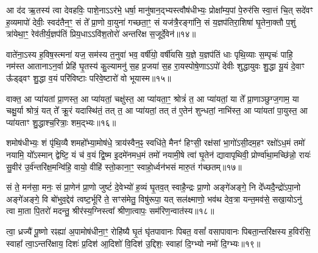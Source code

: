 {\anuvakamend[{भव॑त॒मेक॑त्रिꣳशच्च॥७॥}]}

आ द॑द ऋ॒तस्य॑ त्वा देवहविः॒ पाशे॒ना\-ऽ\-ऽर॑भे॒ धर्\mbox{}षा॒ मानु॑षान॒द्भ्यस्त्वौष॑धीभ्यः॒ प्रोक्षा᳚म्य॒पां पे॒रुर॑सि स्वा॒त्तं चि॒त् सदे॑वꣳ ह॒व्यमापो॑ देवीः॒ स्वद॑तैन॒ꣳ॒ सं ते᳚ प्रा॒णो वा॒युना॑ गच्छता॒ꣳ॒ सं यज॑त्रै॒रङ्गा॑नि॒ सं य॒ज्ञप॑तिरा॒शिषा॑ घृ॒तेना॒क्तौ प॒शुं त्रा॑येथा॒ꣳ॒ रेव॑तीर्य॒ज्ञप॑तिं प्रिय॒धा\-ऽ\-ऽवि॑श॒तोरो॑ अन्तरिक्ष स॒जूर्दे॒वेन॑॥१४॥

वाते॑ना॒\-ऽस्य ह॒विष॒स्त्मना॑ यज॒ सम॑स्य त॒नुवा॑ भव॒ वर्\mbox{}षी॑यो॒ वर्\mbox{}षी॑यसि य॒ज्ञे य॒ज्ञप॑तिं धाः पृथि॒व्याः स॒म्पृचः॑ पाहि॒ नम॑स्त आताना\-ऽन॒र्वा प्रेहि॑ घृ॒तस्य॑ कु॒ल्यामनु॑ स॒ह प्र॒जया॑ स॒ह रा॒यस्पोषे॒णा\-ऽ\-ऽपो॑ देवीः शुद्धायुवः शु॒द्धा यू॒यं दे॒वाꣳ ऊ᳚ड्ढ्वꣳ शु॒द्धा व॒यं परि॑विष्टाः परिवे॒ष्टारो॑ वो भूयास्म॥१५॥

{\anuvakamend[{दे॒वेन॒ चतु॑श्चत्वारिꣳशच्च॥८॥}]}

वाक्त॒ आ प्या॑यतां प्रा॒णस्त॒ आ प्या॑यतां॒ चक्षु॑स्त॒ आ प्या॑यता॒ꣳ॒ श्रोत्रं॑ त॒ आ प्या॑यतां॒ या ते᳚ प्रा॒णाञ्छुग्ज॒गाम॒ या चक्षु॒र्या श्रोत्रं॒ यत् ते᳚ क्रू॒रं यदास्थि॑तं॒ तत् त॒ आ प्या॑यतां॒ तत् त॑ ए॒तेन॑ शुन्धतां॒ नाभि॑स्त॒ आ प्या॑यतां पा॒युस्त॒ आ प्या॑यताꣳ शु॒द्धाश्च॒रित्राः॒ शम॒द्भ्यः॥१६॥

शमोष॑धीभ्यः॒ शं पृ॑थि॒व्यै शमहो᳚भ्या॒मोष॑धे॒ त्राय॑स्वैन॒ꣴ॒ स्वधि॑ते॒ मैनꣳ॑ हिꣳसी॒ रक्ष॑सां भा॒गो॑\-ऽसी॒दम॒हꣳ रक्षो॑\-ऽध॒मं तमो॑ नयामि॒ यो᳚\-ऽस्मान् द्वेष्टि॒ यं च॑ व॒यं द्वि॒ष्म इ॒दमे॑नमध॒मं तमो॑ नयामी॒षे त्वा॑ घृ॒तेन॑ द्यावापृथिवी॒ प्रोर्ण्वा॑था॒मच्छि॑न्नो॒ रायः॑ सु॒वीर॑ उ॒र्व॑न्तरि॑क्ष॒मन्वि॑हि॒ वायो॒ वीहि॑ स्तो॒काना॒ꣳ॒ स्वाहो॒र्ध्वन॑भसं मारु॒तं ग॑च्छतम्॥१७॥

{\anuvakamend[{अ॒द्भ्यो वीहि॒ पञ्च॑ च॥९॥}]}

सं ते॒ मन॑सा॒ मनः॒ सं प्रा॒णेन॑ प्रा॒णो जुष्टं॑ दे॒वेभ्यो॑ ह॒व्यं घृ॒तव॒त् स्वाहै॒न्द्रः प्रा॒णो अङ्गे॑अङ्गे॒ नि दे᳚ध्यदै॒न्द्रो॑\-ऽपा॒नो अङ्गे॑अङ्गे॒ वि बो॑भुव॒द्देव॑ त्वष्ट॒र्भूरि॑ ते॒ सꣳस॑मेतु॒ विषु॑रूपा॒ यत् सल॑क्ष्माणो॒ भव॑थ देव॒त्रा यन्त॒मव॑से॒ सखा॒यो\-ऽनु॑ त्वा मा॒ता पि॒तरो॑ मदन्तु॒ श्रीर॑स्य॒ग्निस्त्वा᳚ श्रीणा॒त्वापः॒ सम॑रिण॒न्वात॑स्य॥१८॥

त्वा॒ ध्रज्यै॑ पू॒ष्णो रꣴह्या॑ अ॒पामोष॑धीना॒ꣳ॒ रोहि॑ष्यै घृ॒तं घृ॑तपावानः पिबत॒ वसां᳚ वसापावानः पिबता॒न्तरि॑क्षस्य ह॒विर॑सि॒ स्वाहा᳚ त्वा॒\-ऽन्तरि॑क्षाय॒ दिशः॑ प्र॒दिश॑ आ॒दिशो॑ वि॒दिश॑ उ॒द्दिशः॒ स्वाहा॑ दि॒ग्भ्यो नमो॑ दि॒ग्भ्यः॥१९॥

{\anuvakamend[{वात॑स्या॒ष्टाविꣳ॑शतिश्च॥10॥}]}

